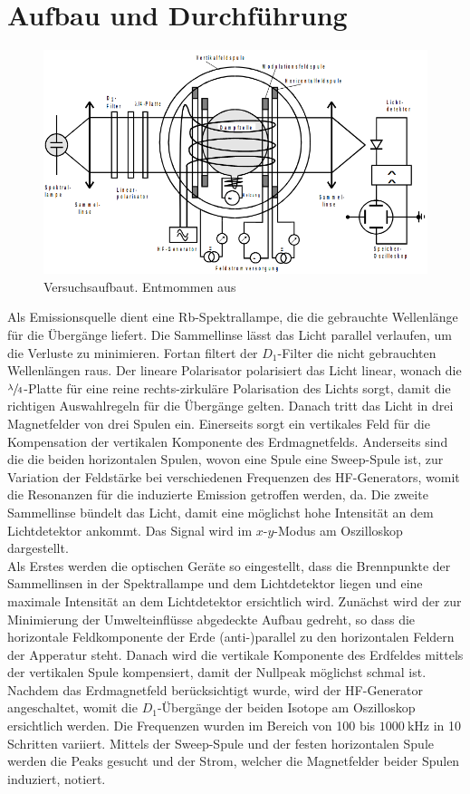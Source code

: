 \section{Aufbau und Durchführung}
\label{sec:Durchführung}
\begin{figure}
    \centering
    \includegraphics[width = 0.9 \textwidth]{pics/Aufbau.png}
    \caption{Versuchsaufbaut.
    Entmommen aus \cite{sample}}
    \label{fig:Ficken}
\end{figure}
Als Emissionsquelle dient eine Rb-Spektrallampe, die die gebrauchte Wellenlänge für die Übergänge liefert.
Die Sammellinse lässt das Licht parallel verlaufen, um die Verluste zu minimieren.
Fortan filtert der $D_1$-Filter die nicht gebrauchten Wellenlängen raus.
Der lineare Polarisator polarisiert das Licht linear, wonach die $\sfrac{\lambda}{4}$-Platte 
für eine reine rechts-zirkuläre Polarisation des Lichts sorgt, damit die richtigen Auswahlregeln für die Übergänge gelten.
Danach tritt das Licht in drei Magnetfelder von drei Spulen ein. 
Einerseits sorgt ein vertikales Feld für die Kompensation der vertikalen Komponente des Erdmagnetfelds.
Anderseits sind die die beiden horizontalen Spulen, wovon eine Spule eine Sweep-Spule ist, zur Variation der Feldstärke bei verschiedenen 
Frequenzen des HF-Generators, womit die Resonanzen für die induzierte Emission getroffen werden, da.
Die zweite Sammellinse bündelt das Licht, damit eine möglichst hohe Intensität an dem Lichtdetektor ankommt.
Das Signal wird im $x\text{-}y$-Modus am Oszilloskop dargestellt.\\
Als Erstes werden die optischen Geräte so eingestellt, dass die Brennpunkte der Sammellinsen in der Spektrallampe und dem Lichtdetektor liegen und 
eine maximale Intensität an dem Lichtdetektor ersichtlich wird.
Zunächst wird der zur Minimierung der Umwelteinflüsse abgedeckte Aufbau gedreht, so dass die horizontale Feldkomponente der Erde (anti-)parallel zu den horizontalen Feldern 
der Apperatur steht. 
Danach wird die vertikale Komponente des Erdfeldes mittels der vertikalen Spule kompensiert, damit
der Nullpeak möglichst schmal ist.
Nachdem das Erdmagnetfeld berücksichtigt wurde, wird der HF-Generator angeschaltet, womit die $D_1$-Übergänge der beiden Isotope
am Oszilloskop ersichtlich werden.
Die  Frequenzen wurden im Bereich von 100 bis $\qty{1000}{\kilo\hertz}$ in 10 Schritten variiert.
Mittels der Sweep-Spule und der festen horizontalen Spule werden die Peaks gesucht und der Strom, welcher die Magnetfelder beider Spulen induziert, notiert.
